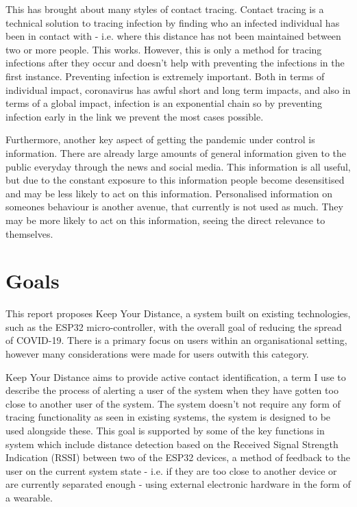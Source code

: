 \documentclass{l4proj}
\begin{document}
This has brought about many styles of contact tracing. Contact tracing is a technical solution to tracing infection by finding who an infected individual has been in contact with - i.e. where this distance has not been maintained between two or more people. This works. However, this is only a method for tracing infections after they occur and doesn't help with preventing the infections in the first instance. Preventing infection is extremely important. Both in terms of individual impact, coronavirus has awful short and long term impacts, and also in terms of a global impact, infection is an exponential chain so by preventing infection early in the link we prevent the most cases possible.

Furthermore, another key aspect of getting the pandemic under control is information. There are already large amounts of general information given to the public everyday through the news and social media. This information is all useful, but due to the constant exposure to this information people become desensitised \citep{koh_messaging_2020} and may be less likely to act on this information. Personalised information on someones behaviour is another avenue, that currently is not used as much. They may be more likely to act on this information, seeing the direct relevance to themselves.

\section{Goals}

This report proposes Keep Your Distance, a system built on existing technologies, such as the ESP32 micro-controller, with the overall goal of reducing the spread of COVID-19. There is a primary focus on users within an organisational setting, however many considerations were made for users outwith this category.

Keep Your Distance aims to provide active contact identification, a term I use to describe the process of alerting a user of the system when they have gotten too close to another user of the system. The system doesn't not require any form of tracing functionality as seen in existing systems, the system is designed to be used alongside these. This goal is supported by some of the key functions in system which include distance detection based on the Received Signal Strength Indication (RSSI) between two of the ESP32 devices, a method of feedback to the user on the current system state - i.e. if they are too close to another device or are currently separated enough - using external electronic hardware in the form of a wearable.
\end{document}
